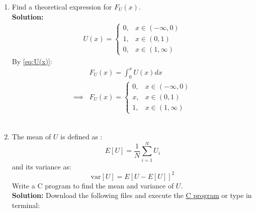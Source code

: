 \documentclass[journal,12pt,twocolumn]{IEEEtran}
\numberwithin{equation}{section}
\renewcommand\thesection{\arabic{section}}
\providecommand{\sbrak}[1]{\ensuremath{{}\left[#1\right]}}
\providecommand{\gitlink}[2]{{\color{blue}\href{https://github.com/SterbenVD/AI1110-Assignments/blob/main/Assignment\%20-\%20Random\%20Numbers/#1}{#2}}}
\newcommand{\solution}{\noindent \textbf{Solution: }}
\begin{document}
\begin{enumerate}[label=\thesection.\arabic*,ref=\thesection.\theenumi]
\begin{figure}[H]
              \caption{The CDF of $U$}
              \label{fig:1_cdf}
          \end{figure}
          \solution  The following \gitlink{codes/1-2.py}{python code} plots Fig. \ref{fig:1_cdf} or type in terminal:
          \begin{lstlisting}
wget https://github.com/SterbenVD/AI1110-Assignments/blob/main/Assignment\%20-\%20Random\%20Numbers/codes/1-2.py
            \end{lstlisting}
    \item Find a  theoretical expression for $F_{U}(x)$.
          \\
          \solution
          \begin{align}
              \label{eq:U(x)}
              U(x) =
              \begin{cases}
                  0, & x \in (-\infty,0)
                  \\
                  1, & x \in (0,1)
                  \\
                  0, & x \in (1, \infty)
              \end{cases}
          \end{align}
          By \eqref{eq:U(x)}:
          \begin{align}
                       & F_U(x) = \int_0^x U(x) dx
              \\
              \implies & F_U(x) =
              \begin{cases}
                  0, & x \in (-\infty,0)
                  \\
                  x, & x \in (0,1)
                  \\
                  1, & x \in (1, \infty)
              \end{cases}
          \end{align}
          \\
    \item
          The mean of $U$ is defined as :
          \begin{equation}
              E\sbrak{U} = \dfrac{1}{N}\sum_{i=1}^{N}U_i
          \end{equation}
          and its variance as:
          \begin{equation}
              \text{var}\sbrak{U} = E\sbrak{U- E\sbrak{U}}^2
          \end{equation}
          Write a C program to  find the mean and variance of $U$.
          \\
          \solution Download the following files and execute the \gitlink{codes/1-4.c}{C program} or type in terminal:

\end{enumerate}
\end{document}
